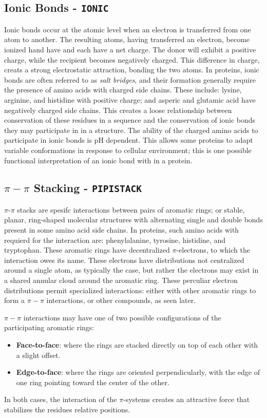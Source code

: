 \subsection{Ionic Bonds - \texttt{IONIC}}
Ionic bonds occur at the atomic level when an electron is transferred from one atom to another. The resulting atoms, having transferred an electron, become ionized hand have and each have a net charge. The donor will exhibit a positive charge, while the recipient becomes negatively charged. This difference in charge, creats a strong electrostatic attraction, bonding the two atoms. 
In proteins, ionic bonds are often referred to as \emph{salt bridges}, and their formation generally require the presence of amino acids with charged side chains. These include: lysine, arginine, and histidine with positive charge; and asperic and glutamic acid have negatively charged side chains.
This creates a loose relationship between conservation of these residues in a sequence and the conservation of ionic bonds they may participate in in a structure. %
The ability of the charged amino acids to participate in ionic bonds is pH dependent. This allows some proteins to adapt variable conformations in response to cellular environment; this is one possible functional interpretation of an ionic bond with in a protein.

\subsection{$\pi-\pi$ Stacking - \texttt{PIPISTACK}}
$\pi$-$\pi$ stacks are spesifc interactions between pairs of aromatic rings; or stable, planar, ring-shaped molecular structures with alternating single and double bonds present in some amino acid side chains.
In proteins, such amino acids with requierd for the interaction are: phenylalanine, tyrosine, histidine, and tryptophan. 
These aromatic rings have decentralized $\pi$-electrons, to which the interaction owes its name. 
These electrons have distributions not centralized around a single atom, as typically the case, but rather the electrons may exist in a shared annular cloud around the aromatic ring.
These perculiar electron distributions permit specialized interactions: either with other aromatic rings to form a $\pi-\pi$ interactions, or other compounds, as seen later.

$\pi-\pi$ interactions may have one of two possible configurations of the participating aromatic rings: 
\begin{itemize}
    \item \textbf{Face-to-face}: where the rings are stacked directly on top of each other with a slight offset.
    \item \textbf{Edge-to-face}: where the rings are oriented perpendicularly, with the edge of one ring pointing toward the center of the other.
\end{itemize}
In both cases, the interaction of the $\pi$-systems creates an attractive force that stabilizes the residues relative positions.

